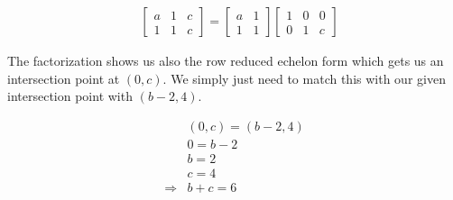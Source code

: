 \begin{solution}
    \begin{align*}
        & 
        \begin{bmatrix}
            a & 1 & c \\
            1 & 1 & c
        \end{bmatrix}
        =
        \begin{bmatrix}
            a & 1 \\
            1 & 1 
        \end{bmatrix}
        \begin{bmatrix}
            1 & 0 & 0 \\
            0 & 1 & c
        \end{bmatrix}
    \end{align*}
    
    The factorization shows us also the row reduced echelon form which gets us an 
    intersection point at $(0, c)$. We simply just need to match this with our given
    intersection point with $(b-2, 4)$. 

    \begin{align*}
        & (0, c) = (b-2, 4) \\
        & 0 = b-2 \\
        & b = 2 \\
        & c = 4 \\
        \Longrightarrow & \boxed{b + c = 6}
    \end{align*}

\end{solution}

